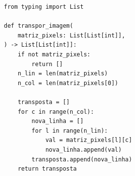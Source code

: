 \ifmostrarGabarito
\begin{verbatim}
from typing import List

def transpor_imagem(
    matriz_pixels: List[List[int]],
) -> List[List[int]]:
    if not matriz_pixels:
        return []
    n_lin = len(matriz_pixels)
    n_col = len(matriz_pixels[0])
    
    transposta = []
    for c in range(n_col):
        nova_linha = []
        for l in range(n_lin):
            val = matriz_pixels[l][c]
            nova_linha.append(val)
        transposta.append(nova_linha)
    return transposta
\end{verbatim}

\fi
